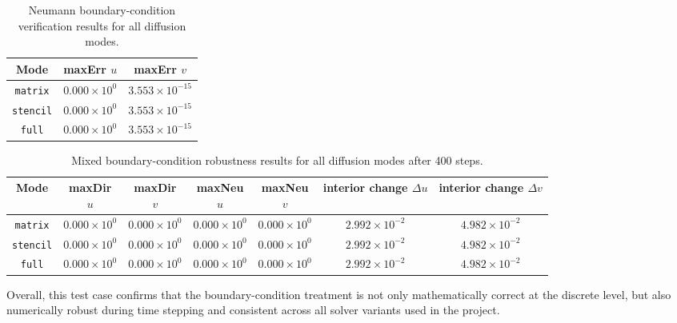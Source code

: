 \begin{table}[htbp]
\centering
\caption{Neumann boundary-condition verification results for all diffusion modes.}
\label{tab:bc_neumann_verification}
\begin{tabular}{|c|c|c|}
\hline
Mode & maxErr \(u\) & maxErr \(v\) \\
\hline
\texttt{matrix}  & \(0.000\times 10^{0}\) & \(3.553\times 10^{-15}\) \\
\texttt{stencil} & \(0.000\times 10^{0}\) & \(3.553\times 10^{-15}\) \\
\texttt{full}    & \(0.000\times 10^{0}\) & \(3.553\times 10^{-15}\) \\
\hline
\end{tabular}
\end{table}

\begin{table}[htbp]
\centering
\small
\setlength{\tabcolsep}{4pt}
\renewcommand{\arraystretch}{1.15}
\caption{Mixed boundary-condition robustness results for all diffusion modes after 400 steps.}
\label{tab:bc_mixed_verification}
\begin{tabular}{|c|c|c|c|c|c|c|}
\hline
Mode
& \shortstack{maxDir\\\(u\)}
& \shortstack{maxDir\\\(v\)}
& \shortstack{maxNeu\\\(u\)}
& \shortstack{maxNeu\\\(v\)}
& \shortstack{interior\\change \(\Delta u\)}
& \shortstack{interior\\change \(\Delta v\)} \\
\hline
\texttt{matrix}  & \(0.000\times 10^{0}\) & \(0.000\times 10^{0}\) & \(0.000\times 10^{0}\) & \(0.000\times 10^{0}\) & \(2.992\times 10^{-2}\) & \(4.982\times 10^{-2}\) \\
\texttt{stencil} & \(0.000\times 10^{0}\) & \(0.000\times 10^{0}\) & \(0.000\times 10^{0}\) & \(0.000\times 10^{0}\) & \(2.992\times 10^{-2}\) & \(4.982\times 10^{-2}\) \\
\texttt{full}    & \(0.000\times 10^{0}\) & \(0.000\times 10^{0}\) & \(0.000\times 10^{0}\) & \(0.000\times 10^{0}\) & \(2.992\times 10^{-2}\) & \(4.982\times 10^{-2}\) \\
\hline
\end{tabular}
\end{table}

Overall, this test case confirms that the boundary-condition treatment is not only mathematically correct at the discrete level, but also numerically robust during time stepping and consistent across all solver variants used in the project.


